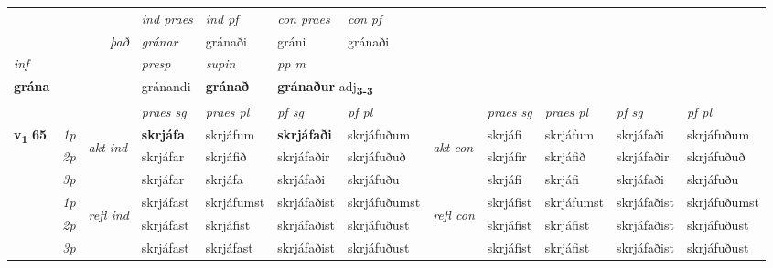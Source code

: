 \begin{longtable}[l]{X>{\footnotesize\itshape}llXXXXlXXXX}
   && &  \textit{ind praes} & \textit{ind pf} & \textit{con praes} & \textit{con pf} \\*
\multicolumn{3}{r}{\textit{það}} & gránar & gránaði & gráni & gránaði \\*

\cmidrule{4-7}
   {\textit{inf}} & &     & \textit{presp} & \textit{supin}  & \textit{pp m} \\*
  {\textbf{grána}} & &     & gránandi &  \textbf{gránað}  & \multicolumn{2}{l}{\textbf{gránaður} adj\textbf{\textsubscript{3-3}}} \\*

\midrule

 & &   & \textit{praes sg}  & \textit{praes pl}    & \textit{ pf sg} & \textit{pf pl} & & \textit{praes sg}  & \textit{praes pl}    & \textit{pf sg} & \textit{pf pl }  \\ \cmidrule{4-7} \cmidrule{9-12}
 \multirow{2}{*}{{{\textbf{v{\textsubscript{1}}} \Large{\textbf{65}}}}}  & 1p & \multirow{3}{*}{\begin{turn}{90}\textit{akt ind}\end{turn}} & \textbf{skrjáfa} & skrjáfum & \textbf{skrjáfaði} & skrjáfuðum & \multirow{3}{*}{\begin{turn}{90}\textit{akt con}\end{turn}} &skrjáfi & skrjáfum & skrjáfaði & skrjáfuðum\\*
 & 2p &  &  skrjáfar  & skrjáfið & skrjáfaðir & skrjáfuðuð & & skrjáfir & skrjáfið & skrjáfaðir & skrjáfuðuð \\*
 & 3p &  & skrjáfar & skrjáfa & skrjáfaði & skrjáfuðu & & skrjáfi & skrjáfi& skrjáfaði & skrjáfuðu \\*
\cmidrule{4-7} \cmidrule{9-12}
 & 1p & \multirow{3}{*}{\begin{turn}{90}\textit{refl ind}\end{turn}}  & skrjáfast & skrjáfumst & skrjáfaðist & skrjáfuðumst & \multirow{3}{*}{\begin{turn}{90}\textit{refl con}\end{turn}}  &skrjáfist & skrjáfumst & skrjáfaðist & skrjáfuðumst \\*
 & 2p &  & skrjáfast & skrjáfist & skrjáfaðist & skrjáfuðust & &skrjáfist & skrjáfist & skrjáfaðist & skrjáfuðust \\*
 & 3p  & & skrjáfast & skrjáfast & skrjáfaðist & skrjáfuðust & & skrjáfist & skrjáfist& skrjáfaðist & skrjáfuðust \\*
\cmidrule{4-7} \cmidrule{9-12}


\end{longtable}

